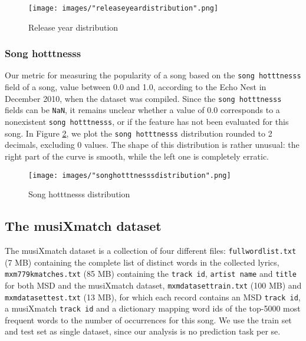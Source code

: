 \documentclass[11pt]{article}
\renewcommand\_{\textunderscore\allowbreak}
\begin{document}
\begin{figure}[h!]
\centering
\captionsetup{width=1.0\textwidth}
\texttt{[image: images/"release\_year\_distribution".png]}
\caption{Release year distribution}
\label{fig:song_duration}
\end{figure}

\subsubsection{Song hotttnesss}
Our metric for measuring the popularity of a song based on the \texttt{song hotttnesss} field of a song, value between 0.0 and 1.0, according to the Echo Nest in December 2010, when the dataset was compiled.
Since the \texttt{song hotttnesss} fields can be \texttt{NaN}, it remains unclear whether a value of 0.0 corresponds to a nonexistent \texttt{song hotttnesss}, or if the feature has not been evaluated for this song.
In Figure \ref{fig:song_hotttnesss_distribution}, we plot the \texttt{song hotttnesss} distribution rounded to 2 decimals, excluding 0 values. 
The shape of this distribution is rather unusual: the right part of the curve is smooth, while the left one is completely erratic.
\begin{figure}[h!]
\centering
\captionsetup{width=1.0\textwidth}
\texttt{[image: images/"song\_hotttnesss\_distribution".png]}
\caption{Song hotttnesss distribution}
\label{fig:song_hotttnesss_distribution}
\end{figure}

\subsection{The musiXmatch dataset}
The musiXmatch dataset is a collection of four different files: 
\texttt{full\_word\_list.txt} (7 MB) containing the complete list of distinct words in the collected lyrics, \texttt{mxm\_779k\_matches.txt} (85 MB) containing the \texttt{track id}, \texttt{artist name} and \texttt{title} for both MSD and the musiXmatch dataset, \texttt{mxm\_dataset\_train.txt} (100 MB) and \texttt{mxm\_dataset\_test.txt} (13 MB), for which each record contains an MSD \texttt{track id}, a musiXmatch \texttt{track id} and a dictionary mapping word ids of the top-5000 most frequent words to the number of occurrences for this song.
We use the train set and test set as single dataset, since our analysis is no prediction task per se.
\end{document}
